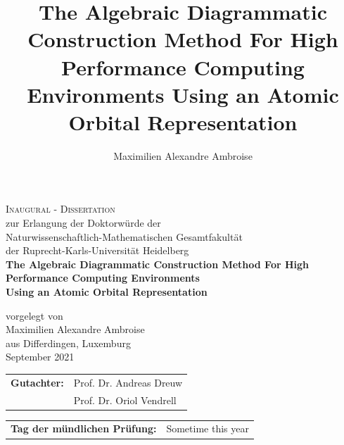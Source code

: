 \documentclass[a4paper,12pt]{book}
\begin{document}
\author{Maximilien Alexandre Ambroise}
\title{The Algebraic Diagrammatic Construction Method For High Performance Computing Environments Using an Atomic Orbital Representation}

\begin{titlepage}
\begin{center}
{\Huge\scshape Inaugural - Dissertation \\}
{ zur Erlangung der Doktorwürde der \\
Naturwissenschaftlich-Mathematischen Gesamtfakultät \\
der Ruprecht-Karls-Universität Heidelberg \\}
\vspace{1cm}
{\huge\bfseries The Algebraic Diagrammatic Construction Method For High Performance Computing Environments \\}
{\Large\bfseries Using an Atomic Orbital Representation \\}
 
\vspace{1.5cm}
{vorgelegt von\\}
\vspace*{1.5cm}
{\Large Maximilien Alexandre Ambroise}\\
{\large aus Differdingen, Luxemburg}\\
\vspace{2cm}
{September 2021} \\[5pt]
\vspace{2cm}
\end{center}

\begin{tabular}{ll}
{\bfseries Gutachter:} & Prof. Dr. Andreas Dreuw \\
 & Prof. Dr. Oriol Vendrell
\end{tabular}

\vspace{0.5cm}

\begin{tabular}{ll}
{\bfseries Tag der mündlichen Prüfung:} & {Sometime this year}
\end{tabular}

\end{titlepage}


\newpage

\vspace*{\fill}
\end{document}
